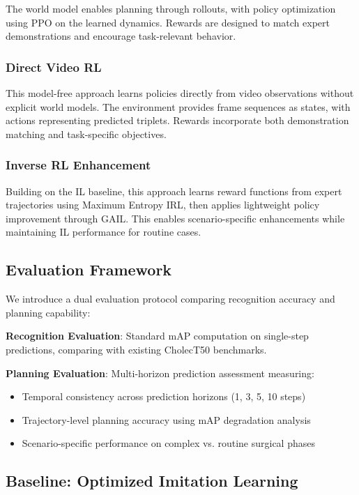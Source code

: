 \documentclass[runningheads]{llncs}
\begin{document}
The world model enables planning through rollouts, with policy optimization using PPO on the learned dynamics. Rewards are designed to match expert demonstrations and encourage task-relevant behavior.

\subsubsection{Direct Video RL}
This model-free approach learns policies directly from video observations without explicit world models. The environment provides frame sequences as states, with actions representing predicted triplets. Rewards incorporate both demonstration matching and task-specific objectives.

\subsubsection{Inverse RL Enhancement}
Building on the IL baseline, this approach learns reward functions from expert trajectories using Maximum Entropy IRL, then applies lightweight policy improvement through GAIL. This enables scenario-specific enhancements while maintaining IL performance for routine cases.

\subsection{Evaluation Framework}

We introduce a dual evaluation protocol comparing recognition accuracy and planning capability:

\textbf{Recognition Evaluation}: Standard mAP computation on single-step predictions, comparing with existing CholecT50 benchmarks.

\textbf{Planning Evaluation}: Multi-horizon prediction assessment measuring:
\begin{itemize}
\item Temporal consistency across prediction horizons (1, 3, 5, 10 steps)
\item Trajectory-level planning accuracy using mAP degradation analysis
\item Scenario-specific performance on complex vs. routine surgical phases
\end{itemize}


\subsection{Baseline: Optimized Imitation Learning}
\end{document}
